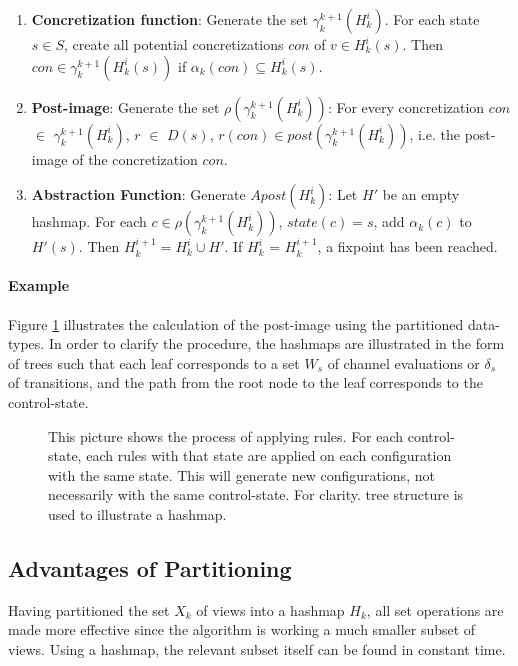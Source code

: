 \begin{enumerate}
\item
\textbf{Concretization function}:
Generate the set $\gamma_k^{k+1}(H_k^i)$. For each state $s \in S$, create all potential concretizations $con$ of $v \in H_k^i(s)$. Then $con \in \gamma_k^{k+1}(H_k^i(s))$ if $\alpha_k(con) \subseteq H_k^i(s)$.

\item
\textbf{Post-image}:
Generate the set $\rho(\gamma_k^{k+1}(H_k^i))$: For every concretization $con$ $\in$ $\gamma_k^{k+1}(H_k^i)$, $r$ $\in$ $D(s)$, $r(con) \in post(\gamma_k^{k+1}(H_k^i))$, i.e. the post-image of the concretization $con$.

\item
\textbf{Abstraction Function}:
Generate $Apost(H_k^i)$: Let $H'$ be an empty hashmap. For each $c \in \rho(\gamma_k^{k+1}(H_k^i))$, $state(c) = s$,  add $\alpha_k(c)$ to $H'(s)$. Then $H_k^{i+1} = H_k^i \cup H'$. If $H_k^i$ = $H_k^{i+1}$, a fixpoint has been reached.
\end{enumerate}

\paragraph{Example}

Figure \ref{applyrule} illustrates the calculation of the post-image using the partitioned data-types. In order to clarify the procedure, the hashmaps are illustrated in the form of trees such that each leaf corresponds to a set $W_s$ of channel evaluations or $\delta_s$ of transitions, and the path from the root node to the leaf corresponds to the control-state.

\begin{figure}
\centering
\def\svgwidth{\columnwidth}

\caption{This picture shows the process of applying rules. For each control-state, each rules with that state are applied on each configuration with the same state. This will generate new configurations, not necessarily with the same control-state. For clarity.  tree structure is used to illustrate a hashmap.}
\label{applyrule}
\end{figure}



\subsection{Advantages of Partitioning}
Having partitioned the set $X_k$ of views into a hashmap $H_k$, all set operations are made more effective since the algorithm is working a much smaller subset of views. Using a hashmap, the relevant subset itself can be found in constant time.

